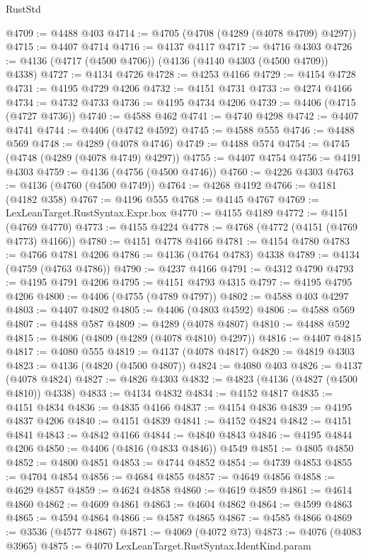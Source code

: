 \begin{lexlean}{RustStd}
\begin{coremodule}
{\begin{coremodule}
{{{{{{{{{{{{{{{{{{{{{{{{{{{{{{{{{{{{{{{{{{{{{{{{{{@4709 := @4488 @403
@4714 := @4705 (@4708 (@4289 (@4078 @4709) @4297))
@4715 := @4407 @4714
@4716 := @4137 @4117
@4717 := @4716 @4303
@4726 := @4136 (@4717 (@4500 @4706)) (@4136 (@4140 @4303 (@4500 @4709)) @4338)
@4727 := @4134 @4726
@4728 := @4253 @4166
@4729 := @4154 @4728
@4731 := @4195 @4729 @4206
@4732 := @4151 @4731
@4733 := @4274 @4166
@4734 := @4732 @4733
@4736 := @4195 @4734 @4206
@4739 := @4406 (@4715 (@4727 @4736))
@4740 := @4588 @462
@4741 := @4740 @4298
@4742 := @4407 @4741
@4744 := @4406 (@4742 @4592)
@4745 := @4588 @555
@4746 := @4488 @569
@4748 := @4289 (@4078 @4746)
@4749 := @4488 @574
@4754 := @4745 (@4748 (@4289 (@4078 @4749) @4297))
@4755 := @4407 @4754
@4756 := @4191 @4303
@4759 := @4136 (@4756 (@4500 @4746))
@4760 := @4226 @4303
@4763 := @4136 (@4760 (@4500 @4749))
@4764 := @4268 @4192
@4766 := @4181 (@4182 @358)
@4767 := @4196 @555
@4768 := @4145 @4767
@4769 := LexLeanTarget.RustSyntax.Expr.box
@4770 := @4155 @4189
@4772 := @4151 (@4769 @4770)
@4773 := @4155 @4224
@4778 := @4768 (@4772 (@4151 (@4769 @4773) @4166))
@4780 := @4151 @4778 @4166
@4781 := @4154 @4780
@4783 := @4766 @4781 @4206
@4786 := @4136 (@4764 @4783) @4338
@4789 := @4134 (@4759 (@4763 @4786))
@4790 := @4237 @4166
@4791 := @4312 @4790
@4793 := @4195 @4791 @4206
@4795 := @4151 @4793 @4315
@4797 := @4195 @4795 @4206
@4800 := @4406 (@4755 (@4789 @4797))
@4802 := @4588 @403 @4297
@4803 := @4407 @4802
@4805 := @4406 (@4803 @4592)
@4806 := @4588 @569
@4807 := @4488 @587
@4809 := @4289 (@4078 @4807)
@4810 := @4488 @592
@4815 := @4806 (@4809 (@4289 (@4078 @4810) @4297))
@4816 := @4407 @4815
@4817 := @4080 @555
@4819 := @4137 (@4078 @4817)
@4820 := @4819 @4303
@4823 := @4136 (@4820 (@4500 @4807))
@4824 := @4080 @403
@4826 := @4137 (@4078 @4824)
@4827 := @4826 @4303
@4832 := @4823 (@4136 (@4827 (@4500 @4810)) @4338)
@4833 := @4134 @4832
@4834 := @4152 @4817
@4835 := @4151 @4834
@4836 := @4835 @4166
@4837 := @4154 @4836
@4839 := @4195 @4837 @4206
@4840 := @4151 @4839
@4841 := @4152 @4824
@4842 := @4151 @4841
@4843 := @4842 @4166
@4844 := @4840 @4843
@4846 := @4195 @4844 @4206
@4850 := @4406 (@4816 (@4833 @4846)) @4549
@4851 := @4805 @4850
@4852 := @4800 @4851
@4853 := @4744 @4852
@4854 := @4739 @4853
@4855 := @4704 @4854
@4856 := @4684 @4855
@4857 := @4649 @4856
@4858 := @4629 @4857
@4859 := @4624 @4858
@4860 := @4619 @4859
@4861 := @4614 @4860
@4862 := @4609 @4861
@4863 := @4604 @4862
@4864 := @4599 @4863
@4865 := @4594 @4864
@4866 := @4587 @4865
@4867 := @4585 @4866
@4869 := @3536 (@4577 @4867)
@4871 := @4069 (@4072 @73)
@4873 := @4076 (@4083 @3965)
@4875 := @4070 LexLeanTarget.RustSyntax.IdentKind.param
}}}}}}}}}}}}}}}}}}}}}}}}}}}}}}}}}}}}}}}}}}}}}}}}}}
\end{coremodule}}
\end{coremodule}
\end{lexlean}
